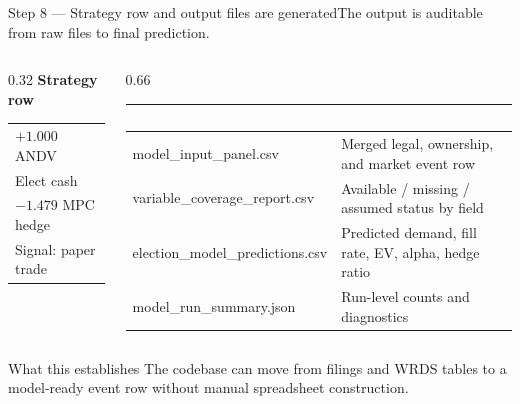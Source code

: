 \documentclass[aspectratio=169,10pt]{beamer}
\newcommand{\hdr}[1]{\textcolor{white}{\normalfont\bfseries #1}}
\begin{document}
\begin{frame}{Step 8 --- Strategy row and output files are generated}{The output is auditable from raw files to final prediction.}
  \vspace{0.1cm}
  \begin{columns}[T]
    \begin{column}{0.32\textwidth}
      {\bfseries\color{navy}Strategy row}\\[4pt]
      \begin{block}{}
        \begin{tabular}{@{}l@{}}
          $+1.000$ ANDV\\
          Elect cash\\
          $-1.479$ MPC hedge\\
          Signal: paper trade\\
        \end{tabular}
      \end{block}
    \end{column}
    \begin{column}{0.66\textwidth}
      {\small
      \begin{tabularx}{\linewidth}{@{}>{\ttfamily\footnotesize}p{4.5cm} X@{}}
        \rowcolor{navy}\hdr{Output file} & \hdr{Purpose}\\ \midrule
        model\_input\_\allowbreak panel.csv & Merged legal, ownership, and market event row\\
        variable\_coverage\_\allowbreak report.csv & Available / missing / assumed status by field\\
        election\_model\_\allowbreak predictions.csv & Predicted demand, fill rate, EV, alpha, hedge ratio\\
        model\_run\_\allowbreak summary.json & Run-level counts and diagnostics\\
      \end{tabularx}}
    \end{column}
  \end{columns}
  \vspace{0.35cm}
  \begin{block}{What this establishes}
    The codebase can move from filings and WRDS tables to a model-ready event row without manual spreadsheet construction.
  \end{block}
\end{frame}
\end{document}
